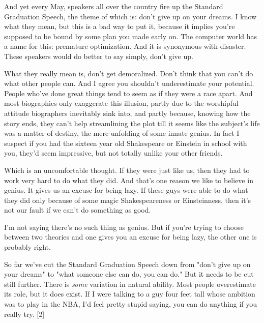 And
                  yet every May, speakers all over the country fire up the
                  Standard Graduation Speech, the theme of which is: don't give
                  up on your dreams. I know what they mean, but this is a bad
                  way to put it, because it implies you're supposed to be bound
                  by some plan you made early on. The computer world has a name
                  for this: premature optimization. And it is synonymous with
                  disaster. These speakers would do better to say simply, don't
                  give up.

What they really mean is, don't get
                  demoralized. Don't think that you can't do what other people
                  can. And I agree you shouldn't underestimate your potential.
                  People who've done great things tend to seem as if they were a
                  race apart. And most biographies only exaggerate this
                  illusion, partly due to the worshipful attitude biographers
                  inevitably sink into, and partly because, knowing how the
                  story ends, they can't help streamlining the plot till it
                  seems like the subject's life was a matter of destiny, the
                  mere unfolding of some innate genius. In fact I suspect if you
                  had the sixteen year old Shakespeare or Einstein in school
                  with you, they'd seem impressive, but not totally unlike your
                  other friends.

Which is an uncomfortable thought.
                  If they were just like us, then they had to work very hard to
                  do what they did. And that's one reason we like to believe in
                  genius. It gives us an excuse for being lazy. If these guys
                  were able to do what they did only because of some magic
                  Shakespeareness or Einsteinness, then it's not our fault if we
                  can't do something as good.

I'm not saying there's
                  no such thing as genius. But if you're trying to choose
                  between two theories and one gives you an excuse for being
                  lazy, the other one is probably right.

So far we've
                  cut the Standard Graduation Speech down from "don't give up on
                  your dreams" to "what someone else can do, you can do." But it
                  needs to be cut still further. There is \emph{some} variation
                  in natural ability. Most people overestimate its role, but it
                  does exist. If I were talking to a guy four feet tall whose
                  ambition was to play in the NBA, I'd feel pretty stupid
                  saying, you can do anything if you really try. [2]

